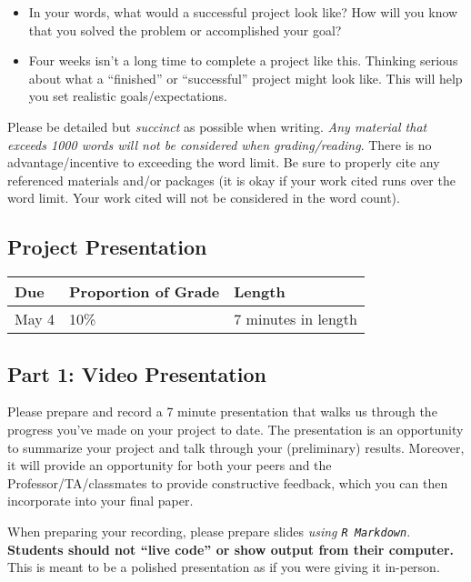 \documentclass[
  12pt,
]{article}
\providecommand{\tightlist}{%
  \setlength{\itemsep}{0pt}\setlength{\parskip}{0pt}}
\begin{document}
\begin{enumerate}
  \begin{itemize}
  \tightlist
  \item
    In your words, what would a successful project look like? How will
    you know that you solved the problem or accomplished your goal?
  \item
    Four weeks isn't a long time to complete a project like this.
    Thinking serious about what a ``finished'' or ``successful'' project
    might look like. This will help you set realistic
    goals/expectations.
  \end{itemize}
\end{enumerate}

Please be detailed but \emph{succinct} as possible when writing.
\emph{Any material that exceeds 1000 words will not be considered when
grading/reading}. There is no advantage/incentive to exceeding the word
limit. Be sure to properly cite any referenced materials and/or packages
(it is okay if your work cited runs over the word limit. Your work cited
will not be considered in the word count).

\hypertarget{project-presentation}{%
\subsection{Project Presentation}\label{project-presentation}}

\begin{longtable}[]{@{}lll@{}}
\toprule
\textbf{Due} & \textbf{Proportion of Grade} &
\textbf{Length}\tabularnewline
\midrule
\endhead
May 4 & 10\% & 7 minutes in length\tabularnewline
\bottomrule
\end{longtable}

\hypertarget{part-1-video-presentation}{%
\subsection{Part 1: Video
Presentation}\label{part-1-video-presentation}}

Please prepare and record a 7 minute presentation that walks us through
the progress you've made on your project to date. The presentation is an
opportunity to summarize your project and talk through your
(preliminary) results. Moreover, it will provide an opportunity for both
your peers and the Professor/TA/classmates to provide constructive
feedback, which you can then incorporate into your final paper.

When preparing your recording, please prepare slides \emph{using
\texttt{R\ Markdown}}. \textbf{Students should not ``live code'' or show
output from their computer.} This is meant to be a polished presentation
as if you were giving it in-person.
\end{document}
